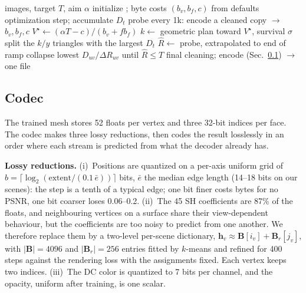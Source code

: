 \begin{algorithm}[t]
\caption{\BM training for a target size $T$}
\label{alg:bm}
\small
\begin{algorithmic}[1]
\Require images, target $T$, aim $\alpha$
\State initialize \MS; byte costs $(b_v, b_f, c)$ from defaults
  \State \MS optimization step; accumulate $D_t$ 
    \State probe every 1k: encode a cleaned copy $\rightarrow$ $b_v, b_f, c$
    \State $V^\star \gets (\alpha T - c)/(b_v + f b_f)$ 
    \State $k \gets$ geometric plan toward $V^\star$, survival $\sigma$ 
    \State split the $k/y$ triangles with the largest $D_t$ 
  \EndIf
    \State $\hat R \gets$ probe, extrapolated to end of ramp
      \State collapse lowest $D_{uv}/\Delta R_{uv}$ until $\hat R \le T$
    \EndIf
  \EndIf
\EndFor
\State final cleaning; encode (Sec.~\ref{sec:codec}) $\rightarrow$ one file
\end{algorithmic}
\end{algorithm}

\subsection{Codec}
\label{sec:codec}
The trained mesh stores 52 floats per vertex and three 32-bit indices per face. The codec makes three lossy reductions, then codes the result losslessly in an order where each stream is predicted from what the decoder already has.

\noindent\textbf{Lossy reductions.} (i)~Positions are quantized on a per-axis uniform grid of $b=\lceil\log_2(\text{extent}/(0.1\,\bar e))\rceil$ bits, $\bar e$ the median edge length (14--18 bits on our scenes): the step is a tenth of a typical edge; one bit finer costs bytes for no PSNR, one bit coarser loses 0.06--0.2\dB. (ii)~The 45 SH coefficients are 87\% of the floats, and neighbouring vertices on a surface share their view-dependent behaviour, but the coefficients are too noisy to predict from one another. We therefore replace them by a two-level per-scene dictionary, $\mathbf{h}_v \approx \mathbf{B}[i_v] + \mathbf{B}_r[j_v]$, with $|\mathbf{B}|=4096$ and $|\mathbf{B}_r|=256$ entries fitted by $k$-means and refined for 400 steps against the rendering loss with the assignments fixed. Each vertex keeps two indices. (iii)~The DC color is quantized to 7 bits per channel, and the opacity, uniform after training, is one scalar.

